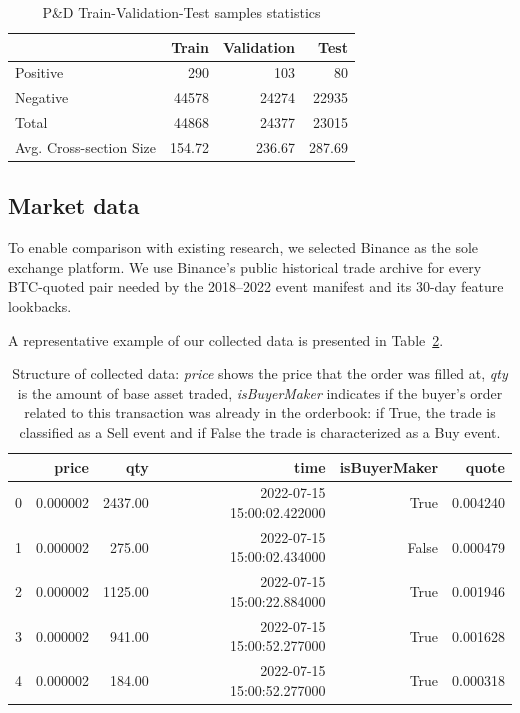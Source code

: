 \documentclass{ieeeaccess}
\begin{document}
\begin{table}[!t]
    \centering
    \setlength{\tabcolsep}{8pt} %
    \renewcommand{\arraystretch}{1.2} %
    
        \begin{tabular}{lrrr}
            \toprule
             & Train & Validation & Test \\
            \midrule
                Positive & 290 & 103 & 80 \\
                Negative & 44578 & 24274 & 22935 \\
                Total & 44868 & 24377 & 23015 \\
                Avg. Cross-section Size & 154.72 & 236.67 & 287.69 \\
            \bottomrule
        \end{tabular}
        \caption{P\&D Train-Validation-Test samples statistics}
     \label{table:train_val_test_stats}
\end{table}

\subsection{Market data}

To enable comparison with existing research, we selected Binance as the sole exchange platform. We use Binance's public historical trade archive for every BTC-quoted pair needed by the 2018--2022 event manifest and its 30-day feature lookbacks.

A representative example of our collected data is presented in Table~\ref{table:collected_tick_data}.

\begin{table}[!t]
    \centering
    \begin{tabular}{lrrrrr}
        \toprule
         & price & qty & time & isBuyerMaker & quote \\
        \midrule
        0 & 0.000002 & 2437.00 & 2022-07-15 15:00:02.422000 & True & 0.004240 \\
        1 & 0.000002 & 275.00& 2022-07-15 15:00:02.434000 & False & 0.000479 \\
        2 & 0.000002 & 1125.00 & 2022-07-15 15:00:22.884000 & True & 0.001946 \\
        3 & 0.000002 & 941.00 & 2022-07-15 15:00:52.277000 & True & 0.001628 \\
        4 & 0.000002 & 184.00 & 2022-07-15 15:00:52.277000 & True & 0.000318 \\
        \bottomrule
    \end{tabular}
    \caption{Structure of collected data: \textit{price} shows the price that the order was filled at, \textit{qty} is the amount of base asset traded, \textit{isBuyerMaker} indicates if the buyer's order related to this transaction was already in the orderbook: if True, the trade is classified as a Sell event and if False the trade is characterized as a Buy event.}
    \label{table:collected_tick_data}
\end{table}
\end{document}

